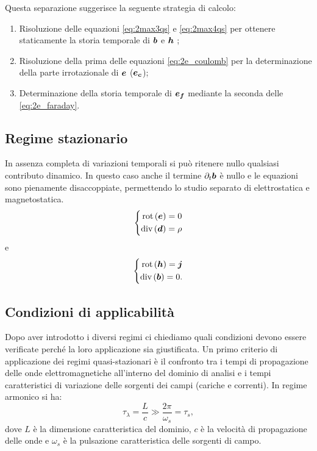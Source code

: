 Questa separazione suggerisce la seguente strategia di calcolo:
\begin{enumerate}
\item Risoluzione delle equazioni \eqref{eq:2max3qs} e \eqref{eq:2max4qs} per ottenere staticamente la storia temporale di $\boldsymbol{b}$ e $\boldsymbol{h}$ ;
\item Risoluzione della prima delle equazioni \eqref{eq:2e_coulomb} per la determinazione della parte irrotazionale di $\boldsymbol{e}$ ($\boldsymbol{e_c}$);
\item Determinazione della storia temporale di $\boldsymbol{e_f}$ mediante la seconda delle \eqref{eq:2e_faraday}.
\end{enumerate}


\subsection{Regime stazionario}
In assenza completa di variazioni temporali si può ritenere nullo qualsiasi contributo dinamico. In questo caso anche il termine $\partial_t\boldsymbol{b}$ è nullo e le equazioni sono pienamente disaccoppiate, permettendo lo studio separato di elettrostatica e magnetostatica.
\begin{equation}
\label{eq:2max12s}
\left\{
\begin{aligned}
\text{rot}\left(\boldsymbol{e}\right)=0\\
\text{div}\left(\boldsymbol{d}\right)=\rho
\end{aligned}
\right.
\end{equation}
e
\begin{equation}
\label{eq:2max34s}
\left\{
\begin{aligned}
\text{rot}\left(\boldsymbol{h}\right)=\boldsymbol{j}\\
\text{div}\left(\boldsymbol{b}\right)=0.
\end{aligned}
\right.
\end{equation}
\subsection{Condizioni di applicabilità}
Dopo aver introdotto i diversi regimi ci chiediamo quali condizioni devono essere verificate perché la loro applicazione sia giustificata.
Un primo criterio di applicazione dei regimi quasi-stazionari \citep{zaglmayr_high_2006} è il confronto tra i tempi di propagazione delle onde elettromagnetiche all'interno del dominio di analisi e i tempi caratteristici di variazione delle sorgenti dei campi (cariche e correnti). In regime armonico si ha:
\begin{equation}
\label{eq:2regimi1}
\tau_{\lambda} = \frac{L}{c} \gg \frac{2\pi}{\omega_s} = \tau_s,
\end{equation}
dove $L$ è la dimensione caratteristica del dominio, $c$ è la velocità di propagazione delle onde e $\omega_s$ è la pulsazione caratteristica delle sorgenti di campo.\\


